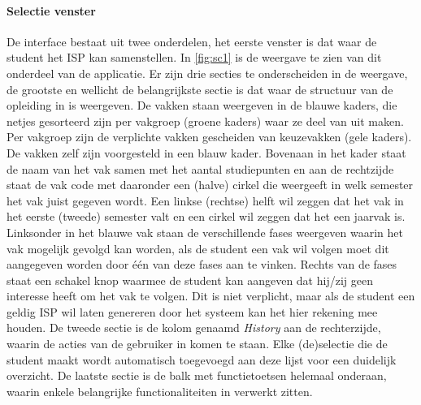 \paragraph{Selectie venster}
De interface bestaat uit twee onderdelen, het eerste venster is dat waar de student het ISP kan samenstellen. In \ref{fig:sc1} is de weergave te zien van dit onderdeel van de applicatie. Er zijn drie secties te onderscheiden in de weergave, de grootste en wellicht de belangrijkste sectie is dat waar de structuur van de opleiding in is weergeven. De vakken staan weergeven in de blauwe kaders, die netjes gesorteerd zijn per vakgroep (groene kaders) waar ze deel van uit maken. Per vakgroep zijn de verplichte vakken gescheiden van keuzevakken (gele kaders). De vakken zelf zijn voorgesteld in een blauw kader. Bovenaan in het kader staat de naam van het vak samen met het aantal studiepunten en aan de rechtzijde staat de vak code met daaronder een (halve) cirkel die weergeeft in welk semester het vak juist gegeven wordt. Een linkse (rechtse) helft wil zeggen dat het vak in het eerste (tweede) semester valt en een cirkel wil zeggen dat het een jaarvak is. Linksonder in het blauwe vak staan de verschillende fases weergeven waarin het vak mogelijk gevolgd kan worden, als de student een vak wil volgen moet dit aangegeven worden door \'{e}\'{e}n van deze fases aan te vinken. Rechts van de fases staat een schakel knop waarmee de student kan aangeven dat hij/zij geen interesse heeft om het vak te volgen. Dit is niet verplicht, maar als de student een geldig ISP wil laten genereren door het systeem kan het hier rekening mee houden. De tweede sectie is de kolom genaamd \textit{History} aan de rechterzijde, waarin de acties van de gebruiker in komen te staan. Elke (de)selectie die de student maakt wordt automatisch toegevoegd aan deze lijst voor een duidelijk overzicht. De laatste sectie is de balk met functietoetsen helemaal onderaan, waarin enkele belangrijke functionaliteiten in verwerkt zitten. 
